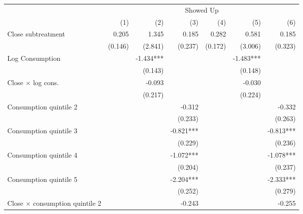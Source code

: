 \begin{tabular}{lrrrrrr}
\toprule
                                      &                   \multicolumn{6}{c}{Showed Up}                   \\ 
\cmidrule(lr){2-7} 
                                      &     (1) &       (2) &       (3) &     (4) &       (5) &       (6) \\ 
\midrule
Close subtreatment                    &   0.205 &     1.345 &     0.185 &   0.282 &     0.581 &     0.185 \\ 
                                      & (0.146) &   (2.841) &   (0.237) & (0.172) &   (3.006) &   (0.323) \\ 
Log Consumption                       &         & -1.434*** &           &         & -1.483*** &           \\ 
                                      &         &   (0.143) &           &         &   (0.148) &           \\ 
Close $\times$ log cons.              &         &    -0.093 &           &         &    -0.030 &           \\ 
                                      &         &   (0.217) &           &         &   (0.224) &           \\ 
Consumption quintile 2                &         &           &    -0.312 &         &           &    -0.332 \\ 
                                      &         &           &   (0.233) &         &           &   (0.263) \\ 
Consumption quintile 3                &         &           & -0.821*** &         &           & -0.813*** \\ 
                                      &         &           &   (0.229) &         &           &   (0.236) \\ 
Consumption quintile 4                &         &           & -1.072*** &         &           & -1.078*** \\ 
                                      &         &           &   (0.204) &         &           &   (0.237) \\ 
Consumption quintile 5                &         &           & -2.204*** &         &           & -2.333*** \\ 
                                      &         &           &   (0.252) &         &           &   (0.279) \\ 
Close $\times$ consumption quintile 2 &         &           &    -0.243 &         &           &    -0.255 \\ 

\end{tabular}

